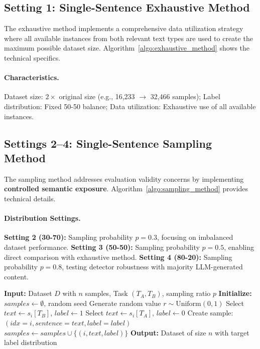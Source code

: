 \subsection{Setting 1: Single-Sentence Exhaustive Method}
\label{appD:setup_1}
The exhaustive method implements a comprehensive data utilization strategy where all available instances from both relevant text types are used to create the maximum possible dataset size. Algorithm~\ref{algo:exhaustive_method} shows the technical specifics.

\paragraph{Characteristics.} Dataset size: $2\times$ original size (e.g., 16,233 $\to$ 32,466 samples); Label distribution: Fixed 50-50 balance; Data utilization: Exhaustive use of all available instances.

\subsection{Settings 2--4: Single-Sentence Sampling Method}
The sampling method addresses evaluation validity concerns by implementing \textbf{controlled semantic exposure}. Algorithm~\ref{algo:sampling_method} provides technical details.

\paragraph{Distribution Settings.} \textbf{Setting 2 (30-70):} Sampling probability $p = 0.3$, focusing on imbalanced dataset performance. \textbf{Setting 3 (50-50):} Sampling probability $p = 0.5$, enabling direct comparison with exhaustive method. \textbf{Setting 4 (80-20):} Sampling probability $p = 0.8$, testing detector robustness with majority LLM-generated content.

\begin{algorithm}[H]
\caption{Single-Sentence Sampling Method}
\begin{algorithmic}[1]
\label{algo:sampling_method}
\STATE \textbf{Input:} Dataset $D$ with $n$ samples, Task $(T_A, T_B)$, sampling ratio $p$
\STATE \textbf{Initialize:} $samples \leftarrow \emptyset$, random seed
    \STATE Generate random value $r \sim \text{Uniform}(0,1)$
        \STATE Select $text \leftarrow s_i[T_B]$, $label \leftarrow 1$
    \ELSE
        \STATE Select $text \leftarrow s_i[T_A]$, $label \leftarrow 0$
    \ENDIF
    \STATE Create sample: $(idx=i, sentence=text, label=label)$
    \STATE $samples \leftarrow samples \cup \{(i, text, label)\}$
\ENDFOR
\STATE \textbf{Output:} Dataset of size $n$ with target label distribution
\end{algorithmic}
\end{algorithm}

